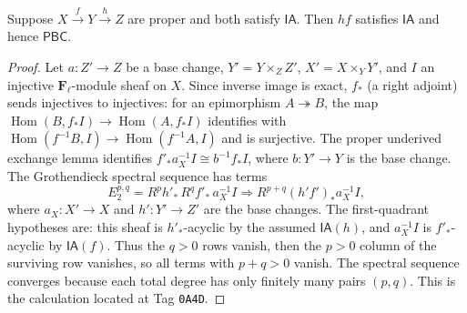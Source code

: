 \begin{lemma}
\label{lemma:weil-pbc-composition}
\uses{}

Suppose $X\xrightarrow{f}Y\xrightarrow{h}Z$ are proper and both satisfy
$\mathsf{IA}$.  Then $hf$ satisfies $\mathsf{IA}$ and hence $\mathsf{PBC}$.
\end{lemma}
\begin{proof}

Let $a:Z'\to Z$ be a base change, $Y'=Y\times_ZZ'$, $X'=X\times_Y Y'$, and
$I$ an injective $\mathbf F_\ell$-module sheaf on $X$.  Since inverse image is exact, $f_*$ (a right adjoint)
sends injectives to injectives: for an epimorphism $A\twoheadrightarrow B$,
the map $\operatorname{Hom}(B,f_*I)\to\operatorname{Hom}(A,f_*I)$ identifies
with $\operatorname{Hom}(f^{-1}B,I)\to\operatorname{Hom}(f^{-1}A,I)$ and is
surjective.  The proper underived exchange lemma identifies
$f'_*a_X^{-1}I\cong b^{-1}f_*I$, where $b:Y'\to Y$ is the base change.
The Grothendieck spectral sequence has terms
\[
 E_2^{p,q}=R^ph'_*\,R^qf'_*\,a_X^{-1}I
 \Longrightarrow R^{p+q}(h'f')_*a_X^{-1}I,
\]
where $a_X:X'\to X$ and $h':Y'\to Z'$ are the base changes.  The
first-quadrant hypotheses are: this sheaf is $h'_*$-acyclic by the assumed
$\mathsf{IA}(h)$, and $a_X^{-1}I$ is
$f'_*$-acyclic by $\mathsf{IA}(f)$.  Thus the $q>0$ rows vanish, then the
$p>0$ column of the surviving row vanishes, so all terms with $p+q>0$
vanish.  The spectral sequence converges because each total degree has only
finitely many pairs $(p,q)$.  This is the calculation located at Tag
\texttt{0A4D}.
\end{proof}

